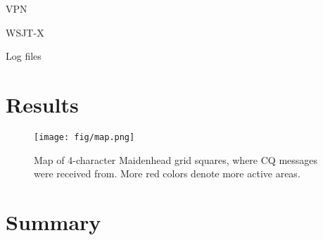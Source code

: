 \documentclass[conference]{IEEEtran}
\begin{document}
VPN

WSJT-X

Log files


\section{Results}

\begin{figure}[htbp]
	\centering
	\texttt{[image: fig/map.png]}
	\caption{Map of 4-character Maidenhead grid squares, where CQ messages were received from.
  More red colors denote more active areas.}
	\label{fig-dummy}
\end{figure}

\section{Summary}




\end{document}
